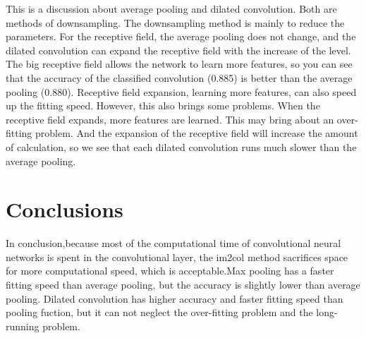 \documentclass{article}
\begin{document}
This is a discussion about average pooling and dilated convolution. Both are methods of downsampling. The downsampling method is mainly to reduce the parameters. For the receptive field, the average pooling does not change, and the dilated convolution can expand the receptive field with the increase of the level. The big receptive field allows the network to learn more features, so you can see that the accuracy of the classified convolution (0.885) is better than the average pooling (0.880). Receptive field expansion, learning more features, can also speed up the fitting speed. However, this also brings some problems. When the receptive field expands, more features are learned. This may bring about an over-fitting problem. And the expansion of the receptive field will increase the amount of calculation, so we see that each dilated convolution runs much slower than the average pooling.






\section{Conclusions}
\label{sec:concl}
In conclusion,because most of the computational time of convolutional neural networks is spent in the convolutional layer, the im2col method sacrifices space for more computational speed, which is acceptable.Max pooling has a faster fitting speed than average pooling, but the accuracy is slightly lower than average pooling. Dilated convolution has higher accuracy and faster fitting speed than pooling fuction, but it can not neglect the over-fitting problem and the long-running problem.



\end{document}

